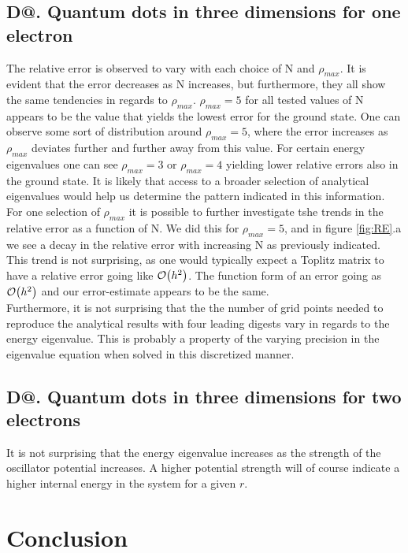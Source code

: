 \documentclass[%
reprint,
amsmath,amssymb,
aps,
]{revtex4-1}
\makeatletter
\newcommand*{\rom}[1]{\expandafter\@slowromancap\romannumeral #1@}
\makeatother
\begin{document}
\subsection*{D\rom{2}. Quantum dots in three dimensions for one electron} \noindent 
The relative error is observed to vary with each choice of N and $\rho_{max}$. It is evident that the error decreases as N increases, but furthermore, they all show the same tendencies in regards to $\rho_{max}$. $\rho_{max} = 5$ for all tested values of N appears to be the value that yields the lowest error for the ground state. One can observe some sort of distribution around $\rho_{max} = 5$, where the error increases as $\rho_{max}$ deviates further and further away from this value. For certain energy eigenvalues one can see $\rho_{max} = 3$ or $\rho_{max} = 4$ yielding lower relative errors also in the ground state. It is likely that access to a broader selection of analytical eigenvalues would help us determine the pattern indicated in this information. \\ \indent 
For one selection of $\rho_{max}$ it is possible to further investigate tshe trends in the relative error as a function of N. We did this for $\rho_{max} = 5$, and in figure \ref{fig:RE}.a we see a decay in the relative error with increasing N as previously indicated. This trend is not surprising, as one would typically expect a Toplitz matrix to have a relative error going like $\order{h^2}$. The function form of an error going as $\order{h^2}$ and our error-estimate appears to be the same. \\ \indent 
Furthermore, it is not surprising that the the number of grid points needed to reproduce the analytical results with four leading digests vary in regards to the energy eigenvalue. This is probably a property of the varying precision in the eigenvalue equation when solved in this discretized manner.  

\subsection*{D\rom{3}. Quantum dots in three dimensions for two electrons} \noindent 
It is not surprising that the energy eigenvalue increases as the strength of the oscillator potential increases. A higher potential strength will of course indicate a higher internal energy in the system for a given $r$.  


\section*{Conclusion}
\end{document}

